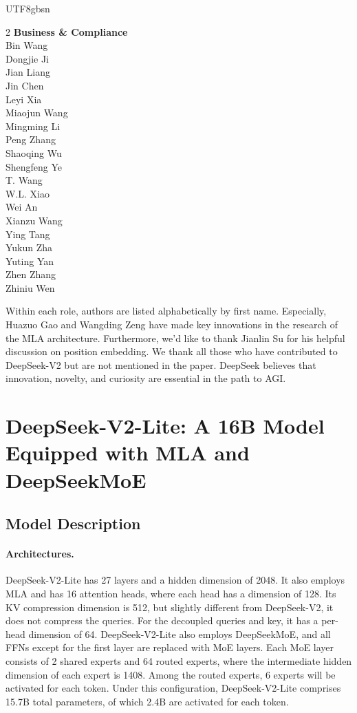 \documentclass[11pt, a4paper, logo, copyright, nonumbering]{deepseek}
\newcommand{\dsvii}{DeepSeek-V2}
\newcommand{\dsviilite}{DeepSeek-V2-Lite}
\newcommand{\dsmoe}{DeepSeekMoE}
\begin{document}
\begin{CJK*}{UTF8}{gbsn}
\begin{multicols}{2}
\noindent
\textbf{Business \& Compliance} \\
Bin Wang  \\
Dongjie Ji  \\
Jian Liang  \\
Jin Chen  \\
Leyi Xia  \\
Miaojun Wang  \\
Mingming Li  \\
Peng Zhang  \\
Shaoqing Wu  \\
Shengfeng Ye  \\
T. Wang  \\
W.L. Xiao  \\
Wei An  \\
Xianzu Wang  \\
Ying Tang  \\
Yukun Zha  \\
Yuting Yan  \\
Zhen Zhang  \\
Zhiniu Wen  \\

\end{multicols} 

Within each role, authors are listed alphabetically by first name.
Especially, Huazuo Gao and Wangding Zeng have made key innovations in the research of the MLA architecture.
Furthermore, we'd like to thank Jianlin Su for his helpful discussion on position embedding.
We thank all those who have contributed to DeepSeek-V2 but are not mentioned in the paper.
DeepSeek believes that innovation, novelty, and curiosity are essential in the path to AGI.

\newpage

\section{\dsviilite{}: A 16B Model Equipped with MLA and DeepSeekMoE}
\label{app:dsviilite}

\subsection{Model Description}

\paragraph{Architectures.}
\dsviilite{} has 27 layers and a hidden dimension of 2048.
It also employs MLA and has 16 attention heads, where each head has a dimension of 128.
Its KV compression dimension is 512, but slightly different from \dsvii{}, it does not compress the queries. 
For the decoupled queries and key, it has a per-head dimension of 64. 
\dsviilite{} also employs \dsmoe{}, and all FFNs except for the first layer are replaced with MoE layers. 
Each MoE layer consists of 2 shared experts and 64 routed experts, where the intermediate hidden dimension of each expert is 1408. 
Among the routed experts, 6 experts will be activated for each token. 
Under this configuration, \dsviilite{} comprises 15.7B total parameters, of which 2.4B are activated for each token. 


\end{CJK*}
\end{document}
